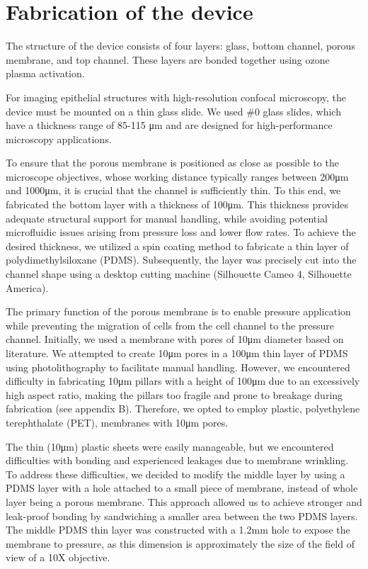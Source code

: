 \hypertarget{fabrication-of-the-device}{%
\section{Fabrication of the device}\label{fabrication-of-the-device}}

The structure of the device consists of four layers: glass, bottom channel, porous membrane, and top channel. These layers are bonded together using ozone plasma activation.

For imaging epithelial structures with high-resolution confocal microscopy, the device must be mounted on a thin glass slide. We used \#0 glass slides, which have a thickness range of 85-115 \unit{\um} and are designed for high-performance microscopy applications. 

To ensure that the porous membrane is positioned as close as possible to the microscope objectives, whose working distance typically ranges between 200\unit{\um} and 1000\unit{\um}, it is crucial that the channel is sufficiently thin. To this end, we fabricated the bottom layer with a thickness of 100\unit{\um}. This thickness provides adequate structural support for manual handling, while avoiding potential microfluidic issues arising from pressure loss and lower flow rates. To achieve the desired thickness, we utilized a spin coating method to fabricate a thin layer of polydimethylsiloxane (PDMS). Subsequently, the layer was precisely cut into the channel shape using a desktop cutting machine (Silhouette Cameo 4, Silhouette America).

The primary function of the porous membrane is to enable pressure application while preventing the migration of cells from the cell channel to the pressure channel. Initially, we used a membrane with pores of 10\unit{\um} diameter based on literature. We attempted to create 10\unit{\um} pores in a 100\unit{\um} thin layer of PDMS using photolithography to facilitate manual handling. However, we encountered difficulty in fabricating 10\unit{\um} pillars with a height of 100\unit{\um} due to an excessively high aspect ratio, making the pillars too fragile and prone to breakage during fabrication (see appendix B). Therefore, we opted to employ plastic, polyethylene terephthalate (PET), membranes with 10\unit{\um} pores. 

The thin (10\unit{\um}) plastic sheets were easily manageable, but we encountered difficulties with bonding and experienced leakages due to membrane wrinkling. To address these difficulties, we decided to modify the middle layer by using a PDMS layer with a hole attached to a small piece of membrane, instead of whole layer being a porous membrane. This approach allowed us to achieve stronger and leak-proof bonding by sandwiching a smaller area between the two PDMS layers. The middle PDMS thin layer was constructed with a 1.2\unit{\mm} hole to expose the membrane to pressure, as this dimension is approximately the size of the field of view of a 10X objective.

